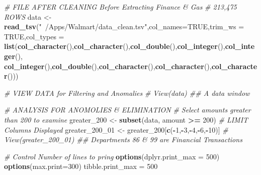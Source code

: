 \documentclass[]{article}
\newenvironment{Shaded}{\begin{snugshade}}{\end{snugshade}}
\newcommand{\KeywordTok}[1]{\textcolor[rgb]{0.13,0.29,0.53}{\textbf{#1}}}
\newcommand{\DataTypeTok}[1]{\textcolor[rgb]{0.13,0.29,0.53}{#1}}
\newcommand{\DecValTok}[1]{\textcolor[rgb]{0.00,0.00,0.81}{#1}}
\newcommand{\StringTok}[1]{\textcolor[rgb]{0.31,0.60,0.02}{#1}}
\newcommand{\CommentTok}[1]{\textcolor[rgb]{0.56,0.35,0.01}{\textit{#1}}}
\newcommand{\OtherTok}[1]{\textcolor[rgb]{0.56,0.35,0.01}{#1}}
\newcommand{\OperatorTok}[1]{\textcolor[rgb]{0.81,0.36,0.00}{\textbf{#1}}}
\newcommand{\NormalTok}[1]{#1}
\begin{document}
\begin{Shaded}
\begin{Highlighting}[]
\CommentTok{# FILE AFTER CLEANING Before Extracting Finance & Gas}
\CommentTok{# 213,475 ROWS}
\NormalTok{data <-}\StringTok{ }\KeywordTok{read_tsv}\NormalTok{(}\StringTok{"~/Apps/Walmart/data_clean.tsv"}\NormalTok{,}\DataTypeTok{col_names=}\OtherTok{TRUE}\NormalTok{,}\DataTypeTok{trim_ws =} \OtherTok{TRUE}\NormalTok{,}\DataTypeTok{col_types =} 
                   \KeywordTok{list}\NormalTok{(}\KeywordTok{col_character}\NormalTok{(),}\KeywordTok{col_character}\NormalTok{(),}\KeywordTok{col_double}\NormalTok{(),}\KeywordTok{col_integer}\NormalTok{(),}\KeywordTok{col_integer}\NormalTok{(),}
                   \KeywordTok{col_integer}\NormalTok{(),}\KeywordTok{col_double}\NormalTok{(),}\KeywordTok{col_character}\NormalTok{(),}\KeywordTok{col_character}\NormalTok{(),}\KeywordTok{col_character}\NormalTok{()))}

\CommentTok{# VIEW DATA for Filtering and Anomalies}
\CommentTok{# View(data)  ## A data window}

\CommentTok{# ANALYSIS FOR ANOMOLIES & ELIMINATION}
\CommentTok{# Select amounts greater than 200 to examine}
\NormalTok{greater_}\DecValTok{200}\NormalTok{ <-}\StringTok{ }\KeywordTok{subset}\NormalTok{(data, amount }\OperatorTok{>=}\StringTok{ }\DecValTok{200}\NormalTok{)}
\CommentTok{# LIMIT Columns Displayed}
\NormalTok{greater_}\DecValTok{200}\NormalTok{_}\DecValTok{01}\NormalTok{ <-}\StringTok{ }\NormalTok{greater_}\DecValTok{200}\NormalTok{[}\KeywordTok{c}\NormalTok{(}\OperatorTok{-}\DecValTok{1}\NormalTok{,}\OperatorTok{-}\DecValTok{3}\NormalTok{,}\OperatorTok{-}\DecValTok{4}\NormalTok{,}\OperatorTok{-}\DecValTok{6}\NormalTok{,}\OperatorTok{-}\DecValTok{10}\NormalTok{)]}
\CommentTok{# View(greater_200_01)  ## Departments 86 & 99 are Financial Transactions}

\CommentTok{# Control Number of lines to pring}
\KeywordTok{options}\NormalTok{(}\DataTypeTok{dplyr.print_max =} \DecValTok{500}\NormalTok{)}
\KeywordTok{options}\NormalTok{(}\DataTypeTok{max.print=}\DecValTok{300}\NormalTok{)}
\NormalTok{tibble.print_max =}\StringTok{ }\DecValTok{500}


\end{Highlighting}
\end{Shaded}
\end{document}
